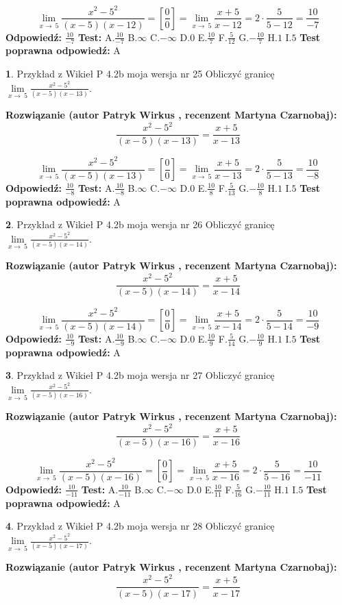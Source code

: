 \documentclass[12pt, a4paper]{article}
\theoremstyle{definition} %
\newtheorem{zad}{}
\newcommand{\zadStart}[1]{\begin{zad}#1\newline}
\newcommand{\zadStop}{\end{zad}}
\newcommand{\rozwStart}[2]{\noindent \textbf{Rozwiązanie (autor #1 , recenzent #2): }\newline}
\newcommand{\rozwStop}{\newline}
\newcommand{\odpStart}{\noindent \textbf{Odpowiedź:}\newline}
\newcommand{\odpStop}{\newline}
\newcommand{\testStart}{\noindent \textbf{Test:}\newline}
\newcommand{\testStop}{\newline}
\newcommand{\kluczStart}{\noindent \textbf{Test poprawna odpowiedź:}\newline}
\newcommand{\kluczStop}{\newline}
\begin{document}
$$\lim\limits_{x\to\ 5}\frac{x^{2}-5^{2}}{(x-5)(x-12)}=[\frac{0}{0}]=\lim\limits_{x\to\ 5}\frac{x+5}{x-12}=2 \cdot \frac{5}{5-12} = \frac{10}{-7}$$
\rozwStop
\odpStart
$\frac{10}{-7}$
\odpStop
\testStart
A.$\frac{10}{-7}$
B.$\infty$
C.$-\infty$
D.$0$
E.$\frac{10}{7}$
F.$\frac{5}{12}$
G.$-\frac{10}{7}$
H.$1$
I.$5$
\testStop
\kluczStart
A
\kluczStop



\zadStart{Przykład z Wikieł P 4.2b moja wersja nr 25}
Obliczyć granicę $\lim\limits_{x\to\ 5}\frac{x^{2}-5^{2}}{(x-5)(x-13)}$.
\zadStop
\rozwStart{Patryk Wirkus}{Martyna Czarnobaj}
$$\frac{x^{2}-5^{2}}{(x-5)(x-13)}=\frac{x+5}{x-13}$$

$$\lim\limits_{x\to\ 5}\frac{x^{2}-5^{2}}{(x-5)(x-13)}=[\frac{0}{0}]=\lim\limits_{x\to\ 5}\frac{x+5}{x-13}=2 \cdot \frac{5}{5-13} = \frac{10}{-8}$$
\rozwStop
\odpStart
$\frac{10}{-8}$
\odpStop
\testStart
A.$\frac{10}{-8}$
B.$\infty$
C.$-\infty$
D.$0$
E.$\frac{10}{8}$
F.$\frac{5}{13}$
G.$-\frac{10}{8}$
H.$1$
I.$5$
\testStop
\kluczStart
A
\kluczStop



\zadStart{Przykład z Wikieł P 4.2b moja wersja nr 26}
Obliczyć granicę $\lim\limits_{x\to\ 5}\frac{x^{2}-5^{2}}{(x-5)(x-14)}$.
\zadStop
\rozwStart{Patryk Wirkus}{Martyna Czarnobaj}
$$\frac{x^{2}-5^{2}}{(x-5)(x-14)}=\frac{x+5}{x-14}$$

$$\lim\limits_{x\to\ 5}\frac{x^{2}-5^{2}}{(x-5)(x-14)}=[\frac{0}{0}]=\lim\limits_{x\to\ 5}\frac{x+5}{x-14}=2 \cdot \frac{5}{5-14} = \frac{10}{-9}$$
\rozwStop
\odpStart
$\frac{10}{-9}$
\odpStop
\testStart
A.$\frac{10}{-9}$
B.$\infty$
C.$-\infty$
D.$0$
E.$\frac{10}{9}$
F.$\frac{5}{14}$
G.$-\frac{10}{9}$
H.$1$
I.$5$
\testStop
\kluczStart
A
\kluczStop



\zadStart{Przykład z Wikieł P 4.2b moja wersja nr 27}
Obliczyć granicę $\lim\limits_{x\to\ 5}\frac{x^{2}-5^{2}}{(x-5)(x-16)}$.
\zadStop
\rozwStart{Patryk Wirkus}{Martyna Czarnobaj}
$$\frac{x^{2}-5^{2}}{(x-5)(x-16)}=\frac{x+5}{x-16}$$

$$\lim\limits_{x\to\ 5}\frac{x^{2}-5^{2}}{(x-5)(x-16)}=[\frac{0}{0}]=\lim\limits_{x\to\ 5}\frac{x+5}{x-16}=2 \cdot \frac{5}{5-16} = \frac{10}{-11}$$
\rozwStop
\odpStart
$\frac{10}{-11}$
\odpStop
\testStart
A.$\frac{10}{-11}$
B.$\infty$
C.$-\infty$
D.$0$
E.$\frac{10}{11}$
F.$\frac{5}{16}$
G.$-\frac{10}{11}$
H.$1$
I.$5$
\testStop
\kluczStart
A
\kluczStop



\zadStart{Przykład z Wikieł P 4.2b moja wersja nr 28}
Obliczyć granicę $\lim\limits_{x\to\ 5}\frac{x^{2}-5^{2}}{(x-5)(x-17)}$.
\zadStop
\rozwStart{Patryk Wirkus}{Martyna Czarnobaj}
$$\frac{x^{2}-5^{2}}{(x-5)(x-17)}=\frac{x+5}{x-17}$$
\end{document}
